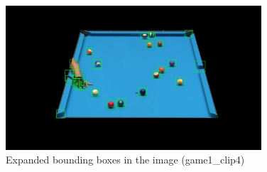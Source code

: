 \begin{figure}[h]
    \centering
    \includegraphics[width=0.85\textwidth]{imgs/ball_localization/exp_boxes_filter.jpg}
    \caption{Expanded bounding boxes in the image (game1\_clip4)}
    \label{fig:exp_bboxes}
\end{figure}

